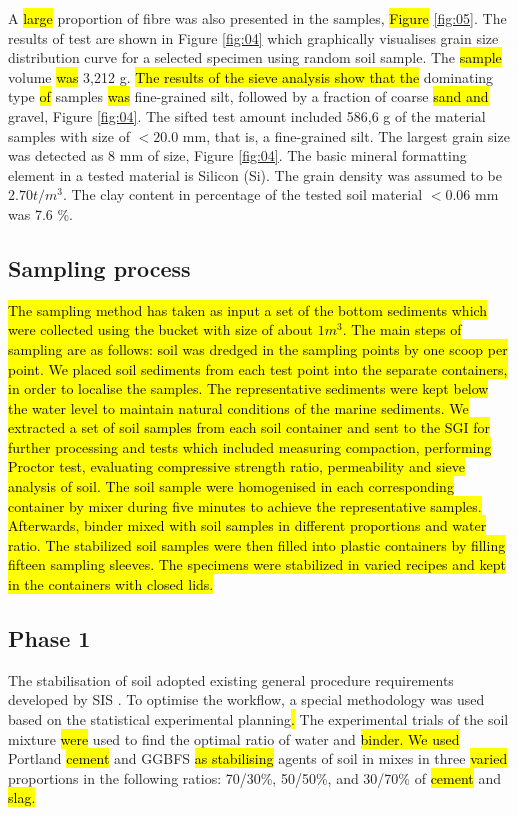 \documentclass{amestyle}
\begin{document}
A \hl{large} proportion of fibre was also presented in the samples, \hl{Figure} \ref{fig:05}. The results of test are shown in Figure \ref{fig:04} which graphically visualises grain size distribution curve for a selected specimen using random soil sample. The \hl{sample} volume \hl{was} 3,212 g. 
\hl{The results of the sieve analysis show that the} dominating type \hl{of} samples \hl{was }fine-grained silt, followed by a fraction of coarse \hl{sand and} gravel, Figure \ref{fig:04}. The sifted test amount included 586,6 g of the material samples with size of $<20.0$ mm, that is, a fine-grained silt. The largest grain size was detected as 8 mm of size, Figure \ref{fig:04}. The basic mineral formatting element in a tested material is Silicon (Si). The grain density was assumed to be $2.70t/m^3$. The clay content in percentage of the tested soil material $<0.06$ mm was 7.6 \%. 

\subsection{Sampling process}
\hl{The sampling method has taken as input a set of the bottom sediments which were collected using the bucket with size of about $1 m^3$. The main steps of sampling are as follows: soil was dredged in the sampling points by one scoop per point. We placed soil sediments from each test point into the separate containers, in order to localise the samples. The representative sediments were kept below the water level to maintain natural conditions of the marine sediments. We extracted a set of soil samples from each soil container and sent to the SGI for further processing and tests which included measuring compaction, performing Proctor test, evaluating compressive strength ratio, permeability and sieve analysis of soil. The soil sample were homogenised in each corresponding container by mixer during five minutes to achieve the representative samples. Afterwards, binder mixed with soil samples in different proportions and water ratio. The stabilized soil samples were then filled into plastic containers by filling fifteen sampling sleeves. The specimens were stabilized in varied recipes and kept in the containers with closed lids.}

\subsection{Phase 1}
The stabilisation of soil adopted existing general procedure requirements developed by SIS \cite{SIS2018}. To optimise the workflow, a special methodology was used based on the statistical experimental planning\hl{. }The experimental trials of the soil mixture \hl{were} used to find the optimal ratio of water and \hl{binder. We used} Portland \hl{cement} and GGBFS \hl{as stabilising} agents of soil in mixes in three \hl{varied} proportions in the following ratios: 70/30\%, 50/50\%, and 30/70\% of \hl{cement} and \hl{slag.} 
\end{document}
